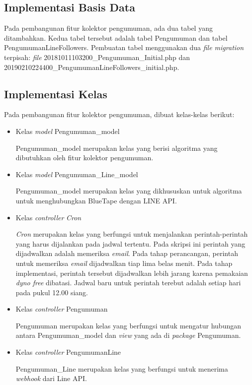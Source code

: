 \subsection{Implementasi Basis Data}
Pada pembangunan fitur kolektor pengumuman, ada dua tabel yang ditambahkan. Kedua tabel tersebut adalah tabel Pengumuman dan tabel PengumumanLineFollowers. Pembuatan tabel menggunakan dua \textit{file migration} terpisah: \textit{file} 20181011103200\_Pengumuman\_Initial.php dan 20190210224400\_PengumumanLineFollowers\_initial.php.

\subsection{Implementasi Kelas}
Pada pembangunan fitur kolektor pengumuman, dibuat kelas-kelas berikut: 
\begin{itemize}
\item Kelas \textit{model} Pengumuman\_model

Pengumuman\_model merupakan kelas yang berisi algoritma yang dibutuhkan oleh fitur kolektor pengumuman.

\item Kelas \textit{model} Pengumuman\_Line\_model

Pengumuman\_model merupakan kelas yang dikhususkan untuk algoritma untuk menghubungkan BlueTape dengan LINE API.

\item Kelas \textit{controller} \textit{Cron}

\textit{Cron} merupakan kelas yang berfungsi untuk menjalankan perintah-perintah yang harus dijalankan pada jadwal tertentu. Pada skripsi ini perintah yang dijadwalkan adalah memeriksa \textit{email}. Pada tahap perancangan, perintah untuk memeriksa \textit{email} dijadwalkan tiap lima belas menit. Pada tahap implementasi, perintah tersebut dijadwalkan lebih jarang karena pemakaian \textit{dyno free} dibatasi. Jadwal baru untuk perintah terebut adalah setiap hari pada pukul 12.00 siang.

\item Kelas \textit{controller} Pengumuman

Pengumuman merupakan kelas yang berfungsi untuk mengatur hubungan antara Pengumuman\_model dan \textit{view} yang ada di \textit{package} Pengumuman.

\item Kelas \textit{controller} PengumumanLine

Pengumuman\_Line merupakan kelas yang berfungsi untuk menerima \textit{webhook} dari Line API.

\end{itemize}

